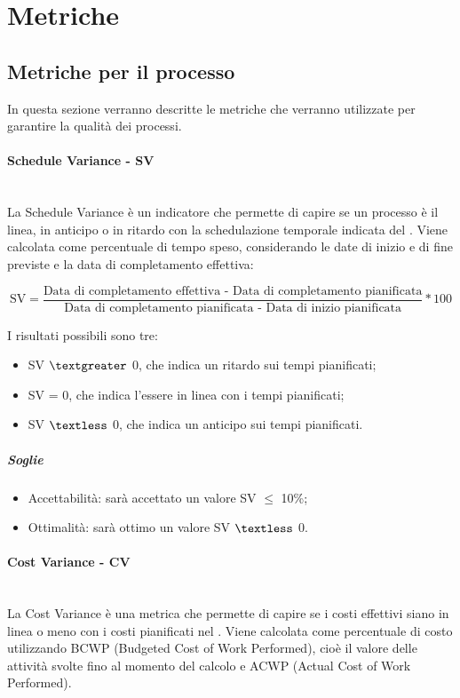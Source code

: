 \pagebreak
\section{Metriche}
\label{AppB:metric}
\subsection{Metriche per il processo}
\label{AppB:metricheProc}
In questa sezione verranno descritte le metriche che verranno utilizzate per garantire la qualità dei processi.

\paragraph{Schedule Variance - SV}
\label{AppB:SV}
	~\\La Schedule Variance è un indicatore che permette di capire se un processo è il linea, in anticipo o in ritardo con la schedulazione temporale indicata del \PdP{}. Viene calcolata come percentuale di tempo speso, considerando le date di inizio e di fine previste e la data di completamento effettiva:
	
	\begin{displaymath}
\mbox{SV}= \frac{\mbox{Data di completamento effettiva - Data di completamento pianificata}} {\mbox{Data di completamento pianificata - Data di inizio pianificata}} * 100
\end{displaymath}

I risultati possibili sono tre:

\begin{itemize}
\item SV $\textgreater$ 0, che indica un ritardo sui tempi pianificati;
\item SV = 0, che indica l'essere in linea con i tempi pianificati;
\item SV $\textless$ 0, che indica un anticipo sui tempi pianificati.
\end{itemize}

\subparagraph{Soglie}
\begin{itemize}
\item Accettabilità: sarà accettato un valore SV $\le$ 10\%;
\item Ottimalità: sarà ottimo un valore SV $\textless$ 0.
\end{itemize}
	
\paragraph{Cost Variance - CV}
\label{AppB:CV}
	~\\La Cost Variance è una metrica che permette di capire se i costi effettivi siano in linea o meno con i costi pianificati nel \PdP{}. Viene calcolata come percentuale di costo utilizzando BCWP (Budgeted Cost of Work Performed), cioè il valore delle attività svolte fino al momento del calcolo e ACWP (Actual Cost of Work Performed).
	
